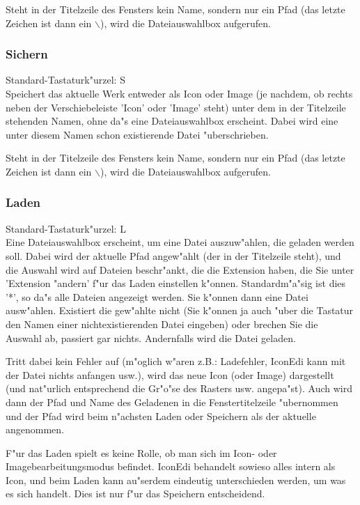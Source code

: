 Steht in der Titelzeile des Fensters kein Name, sondern nur ein 
Pfad (das letzte Zeichen ist dann ein $\backslash$), wird die 
Dateiauswahlbox aufgerufen.

\subsubsection{Sichern}
Standard-Tastaturk"urzel: {\control}S \\ 
Speichert das aktuelle Werk entweder als Icon oder Image (je 
nachdem, ob rechts neben der Verschiebeleiste 'Icon' oder 'Image' 
steht) unter dem in der Titelzeile stehenden Namen, ohne da"s eine 
Dateiauswahlbox erscheint. Dabei wird eine unter diesem Namen 
schon existierende Datei "uberschrieben.

Steht in der Titelzeile des Fensters kein Name, sondern nur ein 
Pfad (das letzte Zeichen ist dann ein $\backslash$), wird die 
Dateiauswahlbox aufgerufen.

\subsubsection{Laden}
Standard-Tastaturk"urzel: {\control}L \\ 
Eine Dateiauswahlbox erscheint, um eine Datei auszuw"ahlen, die 
geladen werden soll. Dabei wird der aktuelle Pfad angew"ahlt (der 
in der Titelzeile steht), und die Auswahl wird auf Dateien 
beschr"ankt, die die Extension haben, die Sie unter 'Extension 
"andern' f"ur das Laden einstellen k"onnen. Standardm"a"sig ist dies '*', 
so da"s alle Dateien angezeigt werden. Sie k"onnen dann eine Datei 
ausw"ahlen. Existiert die gew"ahlte nicht (Sie k"onnen ja auch "uber 
die Tastatur den Namen einer nichtexistierenden Datei eingeben) 
oder brechen Sie die Auswahl ab, passiert gar nichts. Andernfalls 
wird die Datei geladen. 

Tritt dabei kein Fehler auf (m"oglich w"aren z.B.: Ladefehler, 
IconEdi kann mit der Datei nichts anfangen usw.), wird das neue 
Icon (oder Image) dargestellt (und nat"urlich entsprechend die 
Gr"o"se des Rasters usw. angepa"st). Auch wird dann der Pfad und 
Name des Geladenen in die Fenstertitelzeile "ubernommen und der 
Pfad wird beim n"achsten Laden oder Speichern als der aktuelle 
angenommen.

F"ur das Laden spielt es keine Rolle, ob man sich im Icon- oder 
Imagebearbeitungsmodus befindet. IconEdi behandelt sowieso alles 
intern als Icon, und beim Laden kann au"serdem eindeutig 
unterschieden werden, um was es sich handelt. Dies ist nur 
f"ur das Speichern entscheidend.

